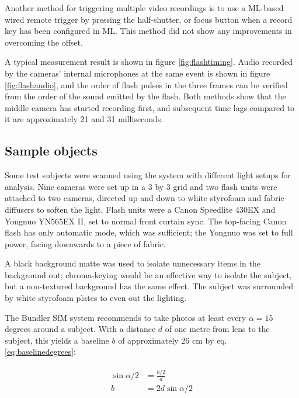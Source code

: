 Another method for triggering multiple video recordings is to use a ML-based wired remote trigger by pressing the half-shutter, or focus button when a record key has been configured in ML.
This method did not show any improvements in overcoming the offset.

A typical measurement result is shown in figure \ref{fig:flashtiming}.
Audio recorded by the cameras' internal microphones at the same event is shown in figure \ref{fig:flashaudio}, and the order of flash pulses in the three frames can be verified from the order of the sound emitted by the flash.
Both methods show that the middle camera has started recording first, and subsequent time lags compared to it are approximately 21 and 31 milliseconds.

\subsection{Sample objects}


Some test subjects were scanned using the system with different light setups for analysis.
Nine cameras were set up in a 3 by 3 grid and two flash units were attached to two cameras, directed up and down to white styrofoam and fabric diffusers to soften the light.
Flash units were a Canon Speedlite 430EX and Yongnuo YN565EX II, set to normal front curtain sync.
The top-facing Canon flash has only automatic mode, which was sufficient; the Yongnuo was set to full power, facing downwards to a piece of fabric.

A black background matte was used to isolate unnecessary items in the background out;
chroma-keying would be an effective way to isolate the subject, but a non-textured background has the same effect.
The subject was surrounded by white styrofoam plates to even out the lighting.

The Bundler SfM system recommends to take photos at least every $\alpha = 15$ degrees around a subject.
With a distance $d$ of one metre from lens to the subject, this yields a baseline $b$ of approximately 26 cm by eq. \ref{eq:baselinedegrees}:

\begin{align} \begin{split} \label{eq:baselinedegrees}
	\sin \alpha/2 &= \frac{b/2}{d}\\
	b &= 2 d \sin \alpha/2
\end{split} \end{align}

